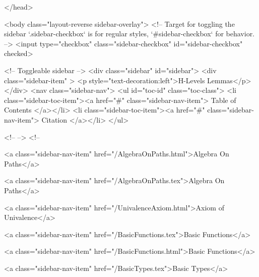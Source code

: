   
</head>




  <body class="layout-reverse sidebar-overlay">
    <!-- Target for toggling the sidebar `.sidebar-checkbox` is for regular
     styles, `#sidebar-checkbox` for behavior. -->
<input type="checkbox" class="sidebar-checkbox" id="sidebar-checkbox" checked>

<!-- Toggleable sidebar -->
<div class="sidebar" id="sidebar">
  <div class="sidebar-item" >
    <p style="text-decoration:left">H-Levels Lemmas</p>
  </div>
  <nav class="sidebar-nav">
    <ul id="toc-id" class="toc-class">
  <li class="sidebar-toc-item"><a href="#" class="sidebar-nav-item"> Table of Contents </a></li>
  <li class="sidebar-toc-item"><a href="#" class="sidebar-nav-item"> Citation </a></li>
</ul>


    <!--  -->
    <!-- 
      
    
      
    
      
    
      
        
      
    
      
        
          <a class="sidebar-nav-item" href="/AlgebraOnPaths.html">Algebra On Paths</a>
        
      
    
      
        
          <a class="sidebar-nav-item" href="/AlgebraOnPaths.tex">Algebra On Paths</a>
        
      
    
      
        
          <a class="sidebar-nav-item" href="/UnivalenceAxiom.html">Axiom of Univalence</a>
        
      
    
      
        
          <a class="sidebar-nav-item" href="/BasicFunctions.tex">Basic Functions</a>
        
      
    
      
        
          <a class="sidebar-nav-item" href="/BasicFunctions.html">Basic Functions</a>
        
      
    
      
        
          <a class="sidebar-nav-item" href="/BasicTypes.tex">Basic Types</a>
        
      
    
      
        
